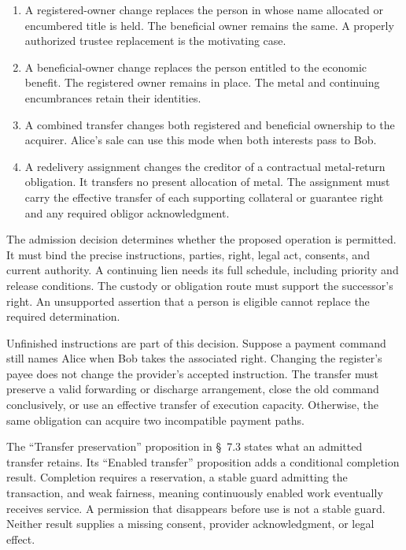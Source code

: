 \documentclass{momentum}
\begin{document}
\begin{enumerate}
\item A registered-owner change replaces the person in whose name allocated or encumbered title is held. The beneficial owner remains the same. A properly authorized trustee replacement is the motivating case.
\item A beneficial-owner change replaces the person entitled to the economic benefit. The registered owner remains in place. The metal and continuing encumbrances retain their identities.
\item A combined transfer changes both registered and beneficial ownership to the acquirer. Alice's sale can use this mode when both interests pass to Bob.
\item A redelivery assignment changes the creditor of a contractual metal-return obligation. It transfers no present allocation of metal. The assignment must carry the effective transfer of each supporting collateral or guarantee right and any required obligor acknowledgment.
\end{enumerate}

The admission decision determines whether the proposed operation is permitted. It must bind the precise instructions, parties, right, legal act, consents, and current authority. A continuing lien needs its full schedule, including priority and release conditions. The custody or obligation route must support the successor's right. An unsupported assertion that a person is eligible cannot replace the required determination.

Unfinished instructions are part of this decision. Suppose a payment command still names Alice when Bob takes the associated right. Changing the register's payee does not change the provider's accepted instruction. The transfer must preserve a valid forwarding or discharge arrangement, close the old command conclusively, or use an effective transfer of execution capacity. Otherwise, the same obligation can acquire two incompatible payment paths.

The ``Transfer preservation'' proposition in \S~7.3 states what an admitted transfer retains. Its ``Enabled transfer'' proposition adds a conditional completion result. Completion requires a reservation, a stable guard admitting the transaction, and weak fairness, meaning continuously enabled work eventually receives service. A permission that disappears before use is not a stable guard. Neither result supplies a missing consent, provider acknowledgment, or legal effect.
\end{document}
